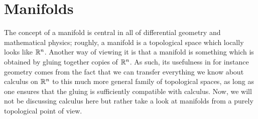 \section{Manifolds}
\label{manifolds}
The concept of a manifold is central in all of differential geometry and mathematical physics; roughly, a manifold is a topological space which locally looks like $\mathbb{R}^n$. Another way of viewing it is that a manifold is something which is obtained by gluing together copies of $\mathbb{R}^n$. As such, its usefulness in for instance geometry comes from the fact that we can transfer everything we know about calculus on $\mathbb{R}^n$ to this much more general family of topological spaces, as long as one ensures that the gluing is sufficiently compatible with calculus. Now, we will not be discussing calculus here but rather take a look at manifolds from a purely topological point of view.

